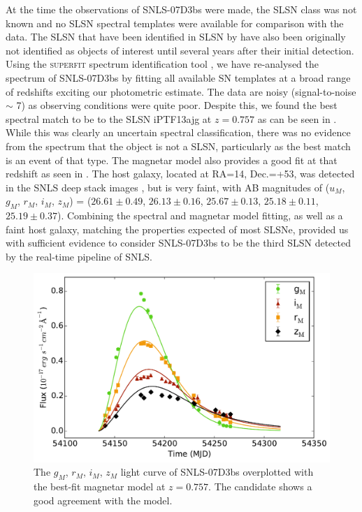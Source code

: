 At the time the observations of SNLS-07D3bs were made, the SLSN class was not known and no SLSN spectral templates were available for comparison with the data. The SLSN that have been identified in SLSN by \citet{Howell2013} have also been originally not identified as objects of interest until several years after their initial detection. Using the \textsc{superfit} spectrum identification tool \citep{Howell2005}, we have re-analysed the spectrum of SNLS-07D3bs by fitting all available SN templates at a broad range of redshifts exciting our photometric estimate. The data are noisy (signal-to-noise $\sim$ 7) as observing conditions were quite poor. Despite this, we found the best spectral match to be to the SLSN iPTF13ajg at $z=0.757$ as can be seen in . While this was clearly an uncertain spectral classification, there was no evidence from the spectrum that the object is not a SLSN, particularly as the best match is an event of that type. The magnetar model also provides a good fit at that redshift as seen in  . The host galaxy, located at RA=14, Dec.=+53, was detected in the SNLS deep stack images \citep{Ilbert2006}, but is very faint, with AB magnitudes of ($u_M$, $g_M$, $r_M$, $i_M$, $z_M$) = ($26.61\pm0.49$, $26.13\pm0.16$, $25.67\pm0.13$, $25.18\pm0.11$, $25.19\pm0.37$). Combining the spectral and magnetar model fitting, as well as a faint host galaxy, matching the properties expected of most SLSNe, provided us with sufficient evidence to consider SNLS-07D3bs to be the third SLSN detected by the real-time pipeline of SNLS.

\begin{figure}
\centering
\includegraphics[scale=0.5]{Figures/Chapter3/07D3bs}
\caption{The $g_M$, $r_M$, $i_M$, $z_M$ light curve of SNLS-07D3bs overplotted with the best-fit magnetar model at $z=0.757$. The candidate shows a good agreement with the model.}
\label{fig:07D3bsLC}
\end{figure}

